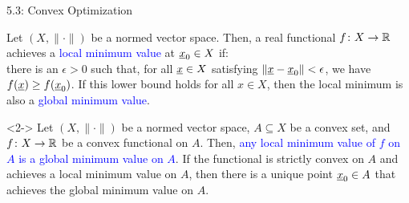 \documentclass[10pt,english,aspectratio=169]{beamer}
\begin{document}
\begin{frame}{5.3: Convex Optimization}

\begin{definition}
Let $(X,\|\cdot\|)$ be a normed vector space.
Then, a real functional $f \colon X \rightarrow \mathbb{R}$ achieves a \textcolor{blue}{local minimum value} at $\underline{x}_0 \in X$ if: \\ \hspace{3mm}  there is an $\epsilon > 0$ such that, for all $\underline{x}\in X$ satisfying $\| \underline{x} - \underline{x}_0 \| < \epsilon$, we have  $f(\underline{x}) \geq f(\underline{x}_0)$.
If this lower bound holds for all $x\in X$, then the local minimum is also a \textcolor{blue}{global minimum value}.
\end{definition}

\vspace{2mm}

\begin{theorem}<2->
Let $(X,\|\cdot\|)$ be a normed vector space, $A \subseteq X$ be a convex set, and $f \colon X \rightarrow \mathbb{R}$ be a convex functional on $A$.
Then, \textcolor{blue}{any local minimum value of $f$ on $A$ is a global minimum value on $A$}.
If the functional is strictly convex on $A$ and achieves a local minimum value on $A$, then there is a unique point $\underline{x}_0 \in A$ that achieves the global minimum value on $A$.
\end{theorem}

\vspace{1mm}


\end{frame}
\end{document}
